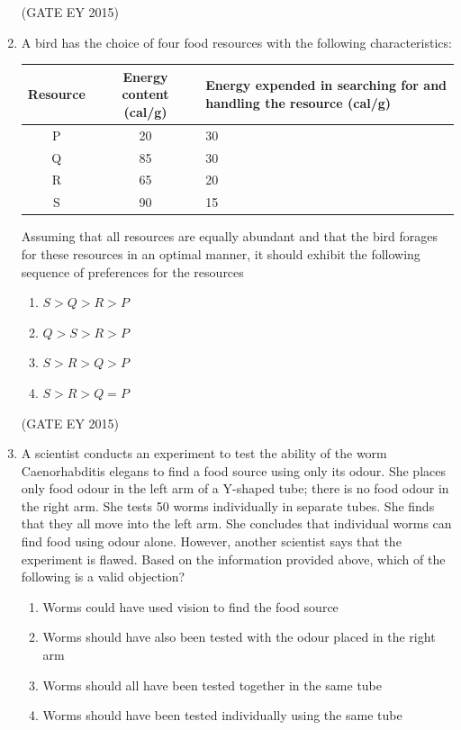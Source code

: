 \documentclass[journal,12pt,onecolumn]{IEEEtran}
\theoremstyle{remark}
\begin{document}
\begin{enumerate}
\begin{enumerate}
    \end{enumerate}
    
\hfill{(GATE EY 2015)}



\item A bird has the choice of four food resources with the following characteristics:
\begin{center}
\begin{tabular}{|c|c|p{5cm}|}
\hline
\textbf{Resource} & \textbf{Energy content (cal/g)} & \textbf{Energy expended in  searching for and handling the resource (cal/g)} \\ \hline
P & 20 & 30 \\ \hline
Q & 85 & 30 \\ \hline
R & 65 & 20 \\ \hline
S & 90 & 15 \\ \hline
\end{tabular}
\end{center}
Assuming that all resources are equally abundant and that the bird forages for these resources in an optimal manner, it should exhibit the following sequence of preferences for the resources


\begin{enumerate}
 \item $S>Q>R>P$
 \item $Q>S>R>P$
 \item $S>R>Q>P$
 \item $S>R>Q=P$
   \end{enumerate}
    
\hfill{(GATE EY 2015)}


\item 
A scientist conducts an experiment to test the ability of the worm Caenorhabditis elegans to find a food source using only its odour. She places only food odour in the left arm of a Y-shaped tube; there is no food odour in the right arm. She tests 50 worms individually in separate tubes. She finds that they all move into the left arm. She concludes that individual worms can find food using odour alone. However, another scientist says that the experiment is flawed. Based on the information provided above, which of the following is a valid objection?


\begin{enumerate}
    
\item Worms could have used vision to find the food source
\item Worms should have also been tested with the odour placed in the right arm
\item Worms should all have been tested together in the same tube
\item  Worms should have been tested individually using the same tube


\end{enumerate}
\end{enumerate}
\end{document}
